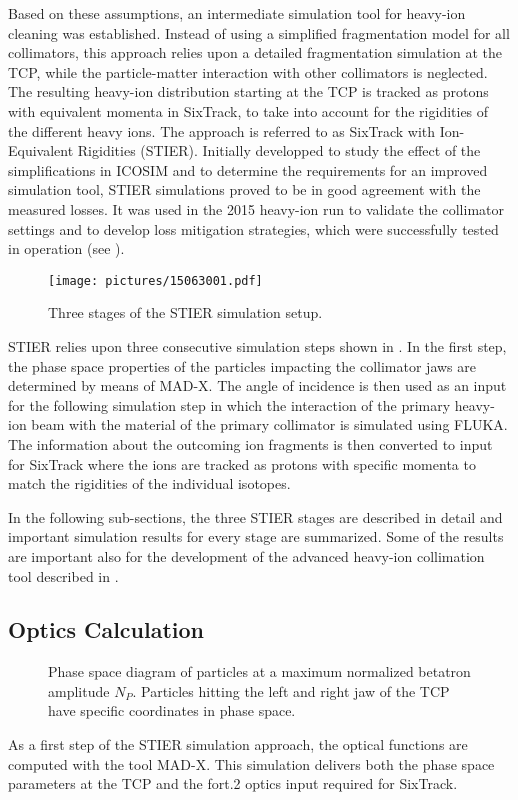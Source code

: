 Based on these assumptions, an intermediate simulation tool for heavy-ion cleaning was established. Instead of using a simplified fragmentation model for all collimators, this approach relies upon a detailed fragmentation simulation at the TCP, while the particle-matter interaction with other collimators is neglected. The resulting heavy-ion distribution starting at the TCP is tracked as protons with equivalent momenta in SixTrack, to take into account for the rigidities of the different heavy ions. The approach is referred to as SixTrack with Ion-Equivalent Rigidities (STIER). Initially developped to study the effect of the simplifications in ICOSIM and to determine the requirements for an improved simulation tool, STIER simulations proved to be in good agreement with the measured losses. It was used in the 2015 heavy-ion run to validate the collimator settings and to develop loss mitigation strategies, which were successfully tested in operation (see ).

%
  \begin{figure}[b]
  \centering
  \texttt{[image: pictures/15063001.pdf]}
  \caption{Three stages of the STIER simulation setup.}  
  \label{pic:15062601}
  \end{figure}
%
STIER relies upon three consecutive simulation steps shown in . In the first step, the phase space properties of the particles impacting the collimator jaws are determined by means of MAD-X. The angle of incidence is then used as an input for the following simulation step in which the interaction of the primary heavy-ion beam with the material of the primary collimator is simulated using FLUKA. The information about the outcoming ion fragments is then converted to input for SixTrack where the ions are tracked as protons with specific momenta to match the rigidities of the individual isotopes.

In the following sub-sections, the three STIER stages are described in detail and important simulation results for every stage are summarized. Some of the results are important also for the development of the advanced heavy-ion collimation tool described in .
%
%
\subsection{Optics Calculation}
%
\begin{figure}[htpb]
  \centering
   \def\svgwidth{0.6\linewidth}
   
  \caption{Phase space diagram of particles at a maximum normalized betatron amplitude $N_P$. Particles hitting the left and right jaw of the TCP have specific coordinates in phase space.}
  \label{pic:14070304}
\end{figure}
%
As a first step of the STIER simulation approach, the optical functions are computed with the tool MAD-X. This simulation delivers both the phase space parameters at the TCP and the fort.2 optics input required for SixTrack. 


